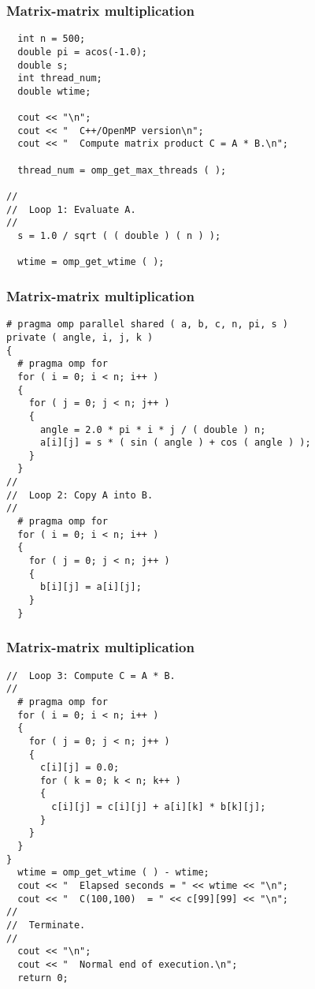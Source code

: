 \documentclass{beamer}
\begin{document}
\begin{frame}
\frametitle{Matrix-matrix multiplication}

\begin{block}{}
\begin{verbatim}
  int n = 500;
  double pi = acos(-1.0);
  double s;
  int thread_num;
  double wtime;

  cout << "\n";
  cout << "  C++/OpenMP version\n";
  cout << "  Compute matrix product C = A * B.\n";

  thread_num = omp_get_max_threads ( );

//
//  Loop 1: Evaluate A.
//
  s = 1.0 / sqrt ( ( double ) ( n ) );

  wtime = omp_get_wtime ( );
\end{verbatim}


\end{block}
\end{frame}

\begin{frame}
\frametitle{Matrix-matrix multiplication}

\begin{block}{}
\begin{verbatim}
# pragma omp parallel shared ( a, b, c, n, pi, s ) 
private ( angle, i, j, k )
{
  # pragma omp for
  for ( i = 0; i < n; i++ )
  {
    for ( j = 0; j < n; j++ )
    {
      angle = 2.0 * pi * i * j / ( double ) n;
      a[i][j] = s * ( sin ( angle ) + cos ( angle ) );
    }
  }
//
//  Loop 2: Copy A into B.
//
  # pragma omp for
  for ( i = 0; i < n; i++ )
  {
    for ( j = 0; j < n; j++ )
    {
      b[i][j] = a[i][j];
    }
  }
\end{verbatim}


\end{block}
\end{frame}

\begin{frame}
\frametitle{Matrix-matrix multiplication}

\begin{block}{}
\begin{verbatim}
//  Loop 3: Compute C = A * B.
//
  # pragma omp for
  for ( i = 0; i < n; i++ )
  {
    for ( j = 0; j < n; j++ )
    {
      c[i][j] = 0.0;
      for ( k = 0; k < n; k++ )
      {
        c[i][j] = c[i][j] + a[i][k] * b[k][j];
      }
    }
  }
}
  wtime = omp_get_wtime ( ) - wtime;
  cout << "  Elapsed seconds = " << wtime << "\n";
  cout << "  C(100,100)  = " << c[99][99] << "\n";
//
//  Terminate.
//
  cout << "\n";
  cout << "  Normal end of execution.\n";
  return 0;
\end{verbatim}


\end{block}
\end{frame}
\end{document}
